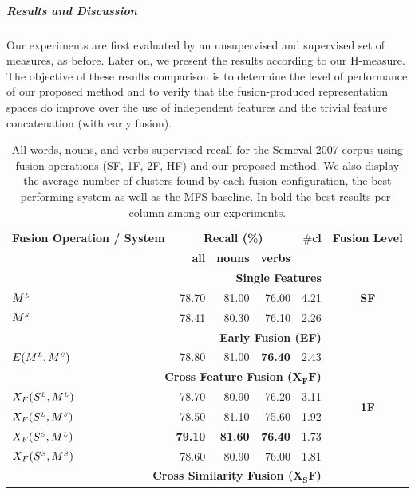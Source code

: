 \subparagraph{Results and Discussion}
Our experiments are first evaluated by an unsupervised and supervised set of measures, as before. Later on, we present the results according to our H-measure. The objective of these results comparison is to determine the level of performance of our proposed method and to verify that the fusion-produced representation spaces do improve over the use of independent features and the trivial feature concatenation (with early fusion).




\begin{table}[htp!]
\centering
\caption{All-words, nouns, and verbs supervised recall for the Semeval 2007 corpus using fusion operations (SF, 1F, 2F, HF) and our proposed method. We also display the average number of clusters found by each fusion configuration, the best performing system as well as the MFS baseline. In bold the best results per-column among our experiments.}
\label{tab:sem2007_PM_Recall}
\begin{tabular}{@{}lrrrrc@{}}
\toprule
\textbf{Fusion Operation / System} & \multicolumn{3}{c}{\textbf{Recall (\%)}} & \#\textbf{cl} & \textbf{Fusion Level}\\ 
        & \textbf{all}          & \textbf{nouns}          & \textbf{verbs} &          \\ 
       \midrule
        \multicolumn{5}{r}{\textbf{Single Features}} & \multirow{3}{*}{\textbf{SF}} \\ %
       $M^{\scriptscriptstyle L}$                    & 78.70 & 81.00 & 76.00 & 4.21\\
 

       $M^{\scriptscriptstyle S}$                    & 78.41 & 80.30 & 76.10 & 2.26\\
       \midrule
                   \multicolumn{5}{r}{\textbf{Early Fusion (EF)}}  & \multirow{10}{*}{\textbf{1F}}     \\ %
       $E(M^{\scriptscriptstyle L}, M^{\scriptscriptstyle S})$		& 78.80 & 81.00 & \textbf{76.40} & 2.43\\
                   \multicolumn{5}{r}{\textbf{Cross Feature Fusion ($\mathbf{X_FF}$)}}       \\ %
	   
	   $X_F(S^{\scriptscriptstyle L}, M^{\scriptscriptstyle L})$		& 78.70 & 80.90 & 76.20  & 3.11\\	   
       $X_F(S^{\scriptscriptstyle L}, M^{\scriptscriptstyle S})$		& 78.50 & 81.10 & 75.60  & 1.92\\
	   $X_F(S^{\scriptscriptstyle S}, M^{\scriptscriptstyle L})$		& \textbf{79.10} & \textbf{81.60} & \textbf{76.40}  & 1.73\\	   
       $X_F(S^{\scriptscriptstyle S}, M^{\scriptscriptstyle S})$		& 78.60 		 & 80.90  & 76.00 & 1.81\\       
                   \multicolumn{5}{r}{\textbf{Cross Similarity Fusion ($\mathbf{X_SF}$)}}       \\ %
	   

\end{tabular}
\end{table}
